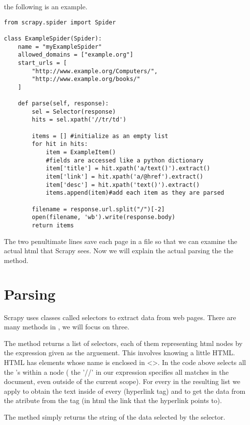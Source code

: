 the following is an example.
\begin{lstlisting}
from scrapy.spider import Spider

class ExampleSpider(Spider):
    name = "myExampleSpider"
    allowed_domains = ["example.org"]
    start_urls = [
        "http://www.example.org/Computers/",
        "http://www.example.org/books/"
    ]

    def parse(self, response):
        sel = Selector(response)
        hits = sel.xpath('//tr/td')

        items = [] #initialize as an empty list
        for hit in hits:
            item = ExampleItem()
			#fields are accessed like a python dictionary
            item['title'] = hit.xpath('a/text()').extract()
            item['link'] = hit.xpath('a/@href').extract()
            item['desc'] = hit.xpath('text()').extract()
            items.append(item)#add each item as they are parsed

		filename = response.url.split("/")[-2]
        open(filename, 'wb').write(response.body)
        return items

\end{lstlisting}

The two penultimate lines save each page in a file so that we can examine the actual html that Scrapy sees.
Now we will explain the actual parsing the the  method.

\section*{Parsing}
Scrapy uses classes called selectors to extract data from web pages.
There are many methods in , we will focus on three.

The  method returns a list of selectors, each of them representing html nodes by the expression given as the arguement. This involves knowing a little HTML. HTML has elements whose name is enclosed in <>. In the code above  selects  all the 's within a  node ( the '//' in our expression specifies all matches in the document, even outside of the current scope). For every  in the resulting list we apply  to obtain the text inside of every  (hyperlink tag) and  to get the data from the  atribute from the  tag (in html the link that the hyperlink points to). 

The  methed simply returns the string of the data selected by the selector.

